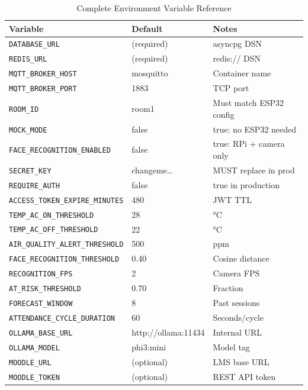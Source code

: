 \begin{table}[H]
\centering
\caption{Complete Environment Variable Reference}
\label{tab:app_env}
\begin{tabular}{@{}p{3.5cm}p{1.8cm}p{2.2cm}@{}}
\toprule
\textbf{Variable} & \textbf{Default} & \textbf{Notes} \\
\midrule
\texttt{DATABASE\_URL}         & (required)    & asyncpg DSN \\
\texttt{REDIS\_URL}            & (required)    & redis:// DSN \\
\texttt{MQTT\_BROKER\_HOST}    & mosquitto     & Container name \\
\texttt{MQTT\_BROKER\_PORT}    & 1883          & TCP port \\
\texttt{ROOM\_ID}              & room1         & Must match ESP32 config \\
\texttt{MOCK\_MODE}            & false         & true: no ESP32 needed \\
\texttt{FACE\_RECOGNITION\_ENABLED} & false   & true: RPi + camera only \\
\texttt{SECRET\_KEY}           & changeme…     & MUST replace in prod \\
\texttt{REQUIRE\_AUTH}         & false         & true in production \\
\texttt{ACCESS\_TOKEN\_EXPIRE\_MINUTES} & 480 & JWT TTL \\
\texttt{TEMP\_AC\_ON\_THRESHOLD}  & 28         & °C \\
\texttt{TEMP\_AC\_OFF\_THRESHOLD} & 22         & °C \\
\texttt{AIR\_QUALITY\_ALERT\_THRESHOLD} & 500 & ppm \\
\texttt{FACE\_RECOGNITION\_THRESHOLD} & 0.40  & Cosine distance \\
\texttt{RECOGNITION\_FPS}      & 2             & Camera FPS \\
\texttt{AT\_RISK\_THRESHOLD}   & 0.70          & Fraction \\
\texttt{FORECAST\_WINDOW}      & 8             & Past sessions \\
\texttt{ATTENDANCE\_CYCLE\_DURATION} & 60     & Seconds/cycle \\
\texttt{OLLAMA\_BASE\_URL}     & http://ollama:11434 & Internal URL \\
\texttt{OLLAMA\_MODEL}         & phi3:mini     & Model tag \\
\texttt{MOODLE\_URL}           & (optional)    & LMS base URL \\
\texttt{MOODLE\_TOKEN}         & (optional)    & REST API token \\
\bottomrule
\end{tabular}
\end{table}

